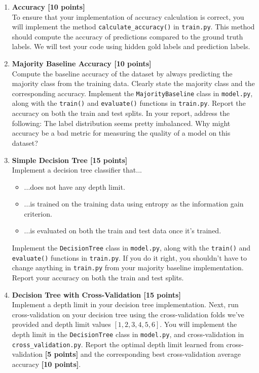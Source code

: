 

\begin{enumerate}
    \item \textbf{Accuracy [10 points]}\\
        To ensure that your implementation of accuracy calculation is correct, you will implement the method \texttt{calculate\_accuracy()} in \texttt{train.py}. 
        This method should compute the accuracy of predictions compared to the ground truth labels. 
        We will test your code using hidden gold labels and prediction labels.

    \item \textbf{Majority Baseline Accuracy [10 points]}\\
        Compute the baseline accuracy of the dataset by always predicting the majority class from the training data. 
        Clearly state the majority class and the corresponding accuracy. 
        Implement the \texttt{MajorityBaseline} class in \texttt{model.py}, along with the \texttt{train()} and \texttt{evaluate()} functions in \texttt{train.py}.
        Report the accuracy on both the train and test splits.
        In your report, address the following: The label distribution seems pretty imbalanced.
        Why might accuracy be a bad metric for measuring the quality of a model on this dataset?

    \item \textbf{Simple Decision Tree [15 points]}\\
        Implement a decision tree classifier that...
        \begin{itemize}\itemsep0em
            \item ...does not have any depth limit.
            \item ...is trained on the training data using entropy as the information gain criterion.
            \item ...is evaluated on both the train and test data once it's trained.
        \end{itemize}
        Implement the \texttt{DecisionTree} class in \texttt{model.py}, along with the \texttt{train()} and \texttt{evaluate()} functions in \texttt{train.py}.
        If you do it right, you shouldn't have to change anything in \texttt{train.py} from your majority baseline implementation.
        Report your accuracy on both the train and test splits.

    \item \textbf{Decision Tree with Cross-Validation [15 points]}\\
        Implement a depth limit in your decision tree implementation.
        Next, run cross-validation on your decision tree using the cross-validation folds we've provided and depth limit values $[1,2,3,4,5,6]$.
        You will implement the depth limit in the \texttt{DecisionTree} class in \texttt{model.py}, and cross-validation in \texttt{cross\_validation.py}.
        Report the optimal depth limit learned from cross-validation \textbf{[5 points]} and the corresponding best cross-validation average accuracy \textbf{[10 points]}.


\end{enumerate}
